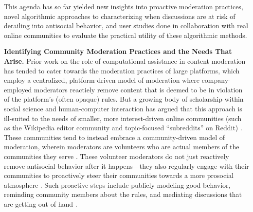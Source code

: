 \documentclass[11pt,letterpaper]{article}
\renewcommand{\section}[1]{\vspace{0.25\baselineskip}\noindent\textbf{#1.}}
\begin{document}
This agenda has so far yielded new insights into proactive moderation practices, novel algorithmic approaches to characterizing when discussions are at risk of derailing into antisocial behavior, and user studies done in collaboration with real online communities to evaluate the practical utility of these algorithmic methods.

\section{Identifying Community Moderation Practices and the Needs That Arise}
Prior work on the role of computational assistance in content moderation has tended to cater towards the moderation practices of large platforms, which employ a centralized, platform-driven model of moderation where company-employed moderators reactiely remove content that is deemed to be in violation of the platform's (often opaque) rules.
But a growing body of scholarship within social science and human-computer interaction has argued that this approach is ill-suited to the needs of smaller, more interest-driven online communities (such as the Wikipedia editor community and topic-focused ``subreddits'' on Reddit) \cite{jurgens_just_2019,seering_reconsidering_2020}.
These communities tend to instead embrace a community-driven model of moderation, wherein moderators are volunteers who are actual members of the communities they serve \cite{lo_when_2018}.
These volunteer moderators do not just reactively remove antisocial behavior after it happens---they also regularly engage with their communities to proactively steer their communities towards a more prosocial atmosphere .
Such proactive steps include publicly modeling good behavior, reminding community members about the rules, and mediating discussions that are getting out of hand \cite{seering_shaping_2017,cai_what_2019,billings_understanding_2010}.
\end{document}
